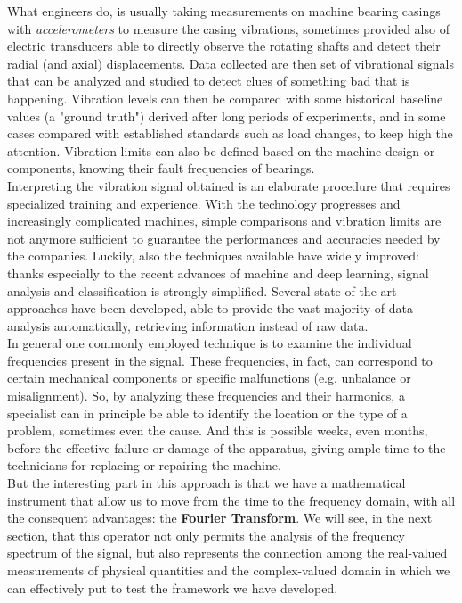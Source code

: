 \documentclass[../main.tex]{subfiles}
\begin{document}
What engineers do, is usually taking measurements on machine bearing casings with \textit{accelerometers} to measure the casing vibrations, sometimes provided also of electric transducers able to directly observe the rotating shafts and detect their radial (and axial) displacements. Data collected are then set of vibrational signals that can be analyzed and studied to detect clues of something bad that is happening. Vibration levels can then be compared with some historical baseline values (a "ground truth") derived after long periods of experiments, and in some cases compared with established standards such as load changes, to keep high the attention. Vibration limits can also be defined based on the machine design or components, knowing their fault frequencies of bearings.\\
Interpreting the vibration signal obtained is an elaborate procedure that requires specialized training and experience. With the technology progresses and increasingly complicated machines, simple comparisons and vibration limits are not anymore sufficient to guarantee the performances and accuracies needed by the companies. Luckily, also the techniques available have widely improved: thanks especially to the recent advances of machine and deep learning, signal analysis and classification is strongly simplified. Several state-of-the-art approaches have been developed, able to provide the vast majority of data analysis automatically, retrieving information instead of raw data.\\
In general one commonly employed technique is to examine the individual frequencies present in the signal. These frequencies, in fact, can correspond to certain mechanical components or specific malfunctions (e.g. unbalance or misalignment). So, by analyzing these frequencies and their harmonics, a specialist can in principle be able to identify the location or the type of a problem, sometimes even the cause. And this is possible weeks, even months, before the effective failure or damage of the apparatus, giving ample time to the technicians for replacing or repairing the machine. \\
But the interesting part in this approach is that we have a mathematical instrument that allow us to move from the time to the frequency domain, with all the consequent advantages: the \textbf{Fourier Transform}. We will see, in the next section, that this operator not only permits the analysis of the frequency spectrum of the signal, but also represents the connection among the real-valued measurements of physical quantities and the complex-valued domain in which we can effectively put to test the framework we have developed.\\
\end{document}
